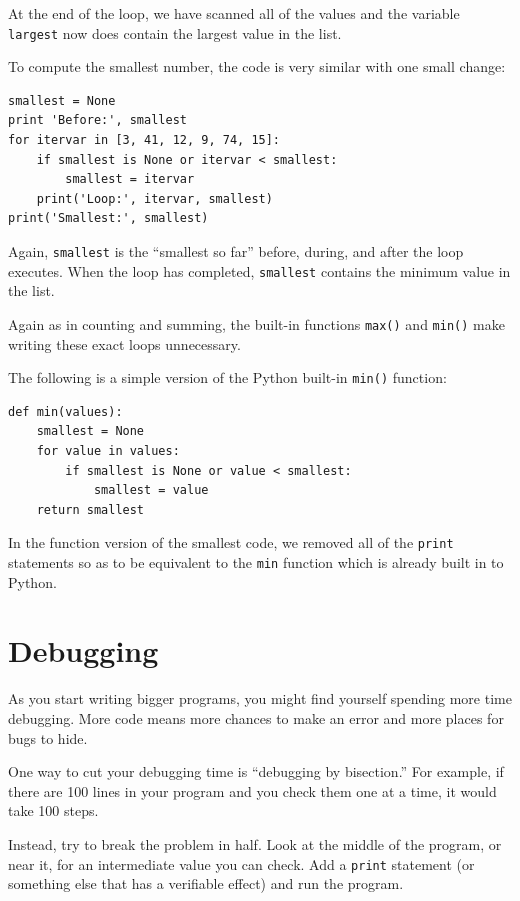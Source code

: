At the end of the loop, we have scanned all of the values and
the variable {\tt largest} now does contain the largest value
in the list.

To compute the smallest number, the code is very similar with one
small change:

\beforeverb
\begin{verbatim}
smallest = None
print 'Before:', smallest
for itervar in [3, 41, 12, 9, 74, 15]:
    if smallest is None or itervar < smallest:
        smallest = itervar
    print('Loop:', itervar, smallest)
print('Smallest:', smallest)
\end{verbatim}
\afterverb
%
Again, {\tt smallest} is the ``smallest so far'' before, during, and after the 
loop executes.  When the loop has completed, {\tt smallest} contains the
minimum value in the list.

Again as in counting and summing, the built-in functions 
{\tt max()} and {\tt min()} make writing these exact loops
unnecessary.

The following is a simple version of the Python built-in
{\tt min()} function:

\beforeverb
\begin{verbatim}
def min(values):
    smallest = None
    for value in values:
        if smallest is None or value < smallest:
            smallest = value
    return smallest
\end{verbatim}
\afterverb
%
In the function version of the smallest code, we removed all of the 
{\tt print} statements so as to be equivalent to the {\tt min} 
function which is already built in to Python.

\section{Debugging}

As you start writing bigger programs, you might find yourself
spending more time debugging.  More code means more chances to
make an error and more places for bugs to hide.


One way to cut your debugging time is ``debugging by bisection.''
For example, if there are 100 lines in your program and you
check them one at a time, it would take 100 steps.

Instead, try to break the problem in half.  Look at the middle
of the program, or near it, for an intermediate value you
can check.  Add a {\tt print} statement (or something else
that has a verifiable effect) and run the program.

